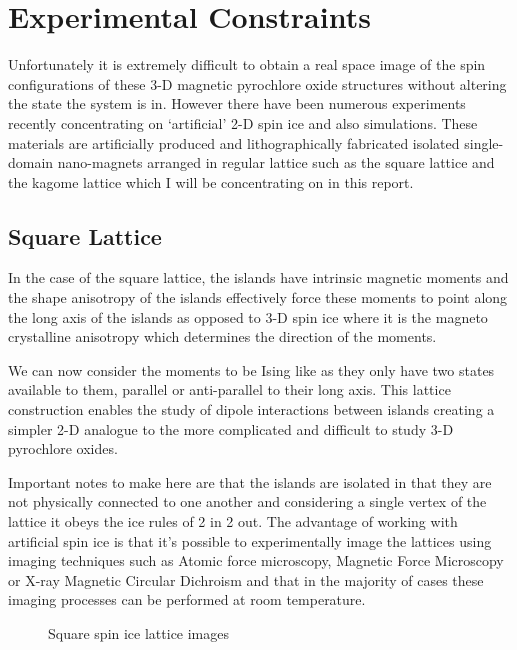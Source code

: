 \section{Experimental Constraints}
Unfortunately it is extremely difficult to obtain a real space image of the spin configurations of these 3-D magnetic pyrochlore oxide structures without altering the state the system is in. However there have been numerous experiments recently concentrating on `artificial' 2-D spin ice and also simulations. These materials are artificially produced and lithographically fabricated isolated single-domain nano-magnets arranged in regular lattice such as the square lattice and the kagome lattice which I will be concentrating on in this report.{\cite{b13}}
\par
\subsection{Square Lattice}
In the case of the square lattice, the islands have intrinsic magnetic moments and the shape anisotropy of the islands effectively force these moments to point along the long axis of the islands as opposed to 3-D spin ice where it is the magneto crystalline anisotropy which determines the direction of the moments.
\par
We can now consider the moments to be Ising like as they only have two states available to them, parallel or anti-parallel to their long axis. This lattice construction enables the study of dipole interactions between islands creating a simpler 2-D analogue to the more complicated and difficult to study 3-D pyrochlore oxides.
\par
Important notes to make here are that the islands are isolated in that they are not physically connected to one another and considering a single vertex of the lattice it obeys the ice rules of 2 in 2 out.  The advantage of working with artificial spin ice is that it's possible to experimentally image the lattices using imaging techniques such as Atomic force microscopy, Magnetic Force Microscopy or X-ray Magnetic Circular Dichroism and that in the majority of cases these imaging processes can be performed at room temperature.
\par
\begin{figure}[ht!]
    \begin{center}
\qquad
        \caption[Imaging techniques used by R.F. Wang et al.]{Square spin ice lattice images}
        \label{fig:gf5}
    \end{center}
\end{figure}
